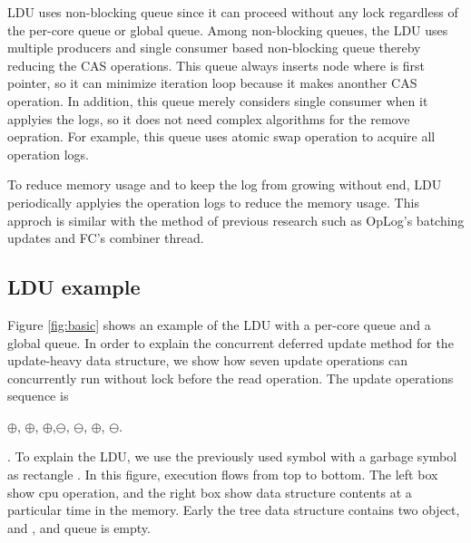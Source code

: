 LDU uses non-blocking queue since it can proceed without any lock regardless
of the per-core queue or global queue.
Among non-blocking queues, the LDU uses multiple producers and single consumer
based non-blocking queue thereby reducing the CAS operations.
This queue always inserts node where is first pointer, so it can minimize
iteration loop because it makes anonther CAS operation.
In addition, this queue merely considers single consumer when it applyies
the logs, so it does not need complex algorithms for the remove oepration.
For example, this queue uses atomic swap operation to acquire all operation 
logs.


To reduce memory usage and to keep the log from growing without end, LDU
periodically applyies the operation logs to reduce the memory usage.
This approch is similar with the method of previous research such as OpLog's
batching updates and FC's combiner thread.


\subsection{LDU example}



Figure \ref{fig:basic} shows an example of the LDU with a per-core queue and
a global queue.
In order to explain the concurrent deferred update method for the update-heavy
data structure, we show how seven update operations can concurrently run
without lock before the read operation.
The update operations sequence is
\begin{center}
$\oplus$, $\oplus$, $\oplus$,$\ominus$,
$\ominus$, $\oplus$, $\ominus$. 
\end{center}.
To explain the LDU, we use the previously used symbol with a garbage symbol as
rectangle .
In this figure, execution flows from top to bottom.
The left box show cpu operation, and the right box show data structure
contents at a particular time in the memory.
Early the tree data structure contains two object,  and ,
and queue is empty.

